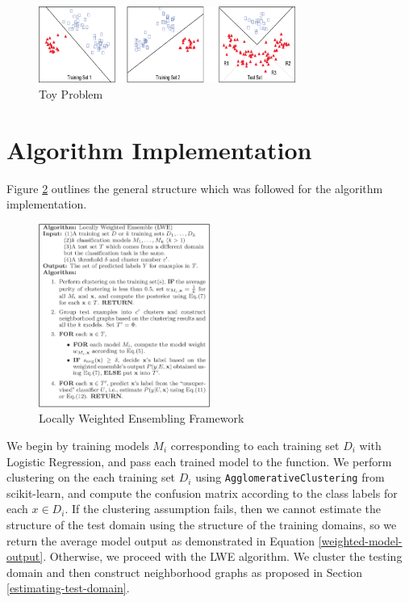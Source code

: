\documentclass[12pt]{article}
\begin{document}
    \begin{figure}[h]
      \centering
      \includegraphics[width=0.75\textwidth]{toy-example.png}
      \caption{Toy Problem}
      \label{toy-data-fig}
    \end{figure}

    \section{Algorithm Implementation} \label{algorithm}
    Figure \ref{lwe-algorithm-fig} outlines the general structure which was followed for the algorithm implementation.
    \begin{figure}[h]
      \centering
      \includegraphics[width=0.5\textwidth]{lwe-algorithm.png}
      \caption{Locally Weighted Ensembling Framework}
      \label{lwe-algorithm-fig}
    \end{figure}

    We begin by training models $M_i$ corresponding to each training set $D_i$ with Logistic Regression, and pass each trained model to the function. We perform clustering on the each training set $D_i$ using \texttt{AgglomerativeClustering} from scikit-learn, and compute the confusion matrix according to the class labels for each $x \in D_i$. If the clustering assumption fails, then we cannot estimate the structure of the test domain using the structure of the training domains, so we return the average model output as demonstrated in Equation \eqref{weighted-model-output}. Otherwise, we proceed with the LWE algorithm. We cluster the testing domain and then construct neighborhood graphs as proposed in Section \ref{estimating-test-domain}.
\end{document}
